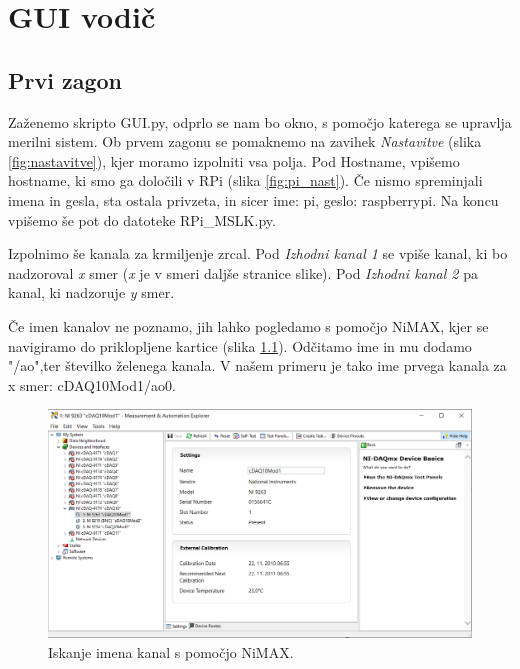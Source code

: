 \chapter{GUI vodič}
\section{Prvi zagon}
Zaženemo skripto GUI.py, odprlo se nam bo okno, s pomočjo katerega se upravlja merilni sistem. Ob prvem zagonu se pomaknemo na zavihek \textit{Nastavitve} (slika \ref{fig:nastavitve}), kjer moramo izpolniti vsa polja. Pod Hostname, vpišemo hostname, ki smo ga določili v RPi (slika \ref{fig:pi_nast}). Če nismo spreminjali imena in gesla, sta ostala privzeta, in sicer ime: pi, geslo: raspberrypi. Na koncu vpišemo še pot do datoteke RPi\_MSLK.py.

Izpolnimo še kanala za krmiljenje zrcal. Pod \textit{Izhodni kanal 1} se vpiše kanal,  ki bo nadzoroval \textit{x} smer (\textit{x} je v smeri daljše stranice slike). Pod \textit{Izhodni kanal 2} pa kanal, ki nadzoruje \textit{y} smer.

Če imen kanalov ne poznamo, jih lahko pogledamo s pomočjo NiMAX, kjer se navigiramo do priklopljene kartice (slika \ref{fig:nimax}). Odčitamo ime in mu dodamo "/ao",ter številko želenega kanala. V našem primeru je tako ime prvega kanala za x smer: cDAQ10Mod1/ao0.
\begin{figure}[H]
    \centering
    \includegraphics[width=\linewidth]{slike/nimax.png}
    \caption{Iskanje imena kanal s pomočjo NiMAX.}
    \label{fig:nimax}
\end{figure}


